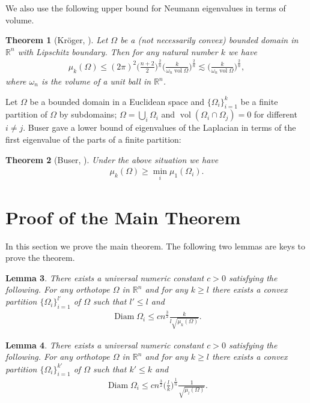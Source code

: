 \documentclass[12pt]{amsart}
\theoremstyle{plain}
\newtheorem{thm}{Theorem}[section]
\newtheorem{lem}[thm]{Lemma}
\theoremstyle{remark}
\newcommand{\vol}{\operatorname{vol}}
\newcommand{\diam}{\operatorname{Diam}}
\begin{document}
We also use the following upper bound for Neumann eigenvalues in terms of volume.   
\begin{thm}[{Kr\"{o}ger, \cite[Corollary 2]{Kr2}}]\label{Kr ineq2}Let $\Omega$ be a (not necessarily convex) bounded domain in $\mathbb{R}^n$ with Lipschitz boundary. Then for any natural number $k$ we have
\begin{align*}
    \mu_k(\Omega)\leq (2\pi)^2\Big(\frac{n+2}{2}\Big)^{\frac{2}{n}}\Big(\frac{k}{\omega_n \vol \Omega}\Big)^{\frac{2}{n}}\lesssim \Big(\frac{k}{\omega_n \vol \Omega}\Big)^{\frac{2}{n}},
\end{align*}where $\omega_n$ is the volume of a unit ball in $\mathbb{R}^n$.
\end{thm}

Let $\Omega$ be a bounded domain in a Euclidean space and $\{\Omega_i\}_{i=1}^{k}$ be a finite partition of $\Omega$ by subdomains;
    $\Omega=\bigcup_i \Omega_i$ and $\vol (\Omega_i\cap \Omega_j)=0$ for different $i\neq j$. Buser gave a lower bound of eigenvalues of the Laplacian in terms of the first eigenvalue of the parts of a finite partition:

\begin{thm}[{Buser, \cite[Theorem 8.2.1]{B}}]\label{Buserthm}Under the above situation we have
    \begin{align*}
        \mu_k(\Omega)\geq \min_i \mu_1(\Omega_i).
    \end{align*}
\end{thm}

   





\section{Proof of the Main Theorem}
In this section we prove the main theorem. 
The following two lemmas are keys to prove the theorem. 
\begin{lem}\label{Mlem1}There exists a universal numeric constant $c>0$ satisfying the following. For any orthotope $\Omega$ in $\mathbb{R}^n$ and for any $k\geq l$ there exists a convex partition $\{\Omega_i\}_{i=1}^{l'}$ of $\Omega$ such that $l'\leq l$ and 
    \begin{align*}
        \diam \Omega_i \leq cn^{\frac{3}{2}}\frac{k}{l\sqrt{\mu_k(\Omega)}}.
    \end{align*}
\end{lem}
\begin{lem}\label{Mlem2}There exists a universal numeric constant $c>0$ satisfying the following. For any orthotope $\Omega$ in $\mathbb{R}^n$ and for any $k\geq l$ there exists a convex partition $\{\Omega_i\}_{i=1}^{k'}$ of $\Omega$ such that $k'\leq k$ and 
    \begin{align*}
        \diam \Omega_i \leq cn^{\frac{3}{2}}\Big(\frac{l}{k}\Big)^{\frac{1}{n}}\frac{1}{\sqrt{\mu_l(\Omega)}}.
    \end{align*}
\end{lem}
\end{document}
